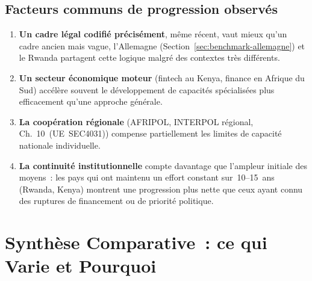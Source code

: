 \subsection{Facteurs communs de progression observés}

\begin{enumerate}
    \item \textbf{Un cadre légal codifié précisément}, même récent,
          vaut mieux qu'un cadre ancien mais vague, l'Allemagne
          (Section~\ref{sec:benchmark-allemagne}) et le Rwanda
          partagent cette logique malgré des contextes très différents.
    \item \textbf{Un secteur économique moteur} (fintech au Kenya,
          finance en Afrique du Sud) accélère souvent le développement
          de capacités spécialisées plus efficacement qu'une approche
          générale.
    \item \textbf{La coopération régionale} (AFRIPOL, INTERPOL
          régional, Ch.~10~(UE~SEC4031)) compense partiellement
          les limites de capacité nationale individuelle.
    \item \textbf{La continuité institutionnelle} compte davantage
          que l'ampleur initiale des moyens~: les pays qui ont
          maintenu un effort constant sur~10--15~ans (Rwanda, Kenya)
          montrent une progression plus nette que ceux ayant connu
          des ruptures de financement ou de priorité politique.
\end{enumerate}

\section{Synthèse Comparative~: ce qui Varie et Pourquoi}
\label{sec:synthese-comparative}

